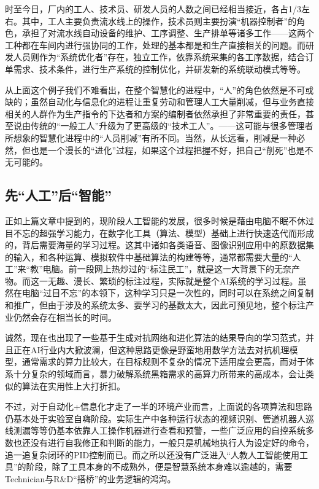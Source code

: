 \documentclass[]{book}
\begin{document}
时至今日，厂内的工人、技术员、研发人员的人数之间已经相当接近，各占1/3左右。其中，工人主要负责流水线上的操作，技术员则主要扮演``机器控制者''的角色，承担了对流水线自动设备的维护、工序调整、生产排单等诸多工作------这两个工种都在车间内进行强协同的工作，处理的基本都是和生产直接相关的问题。而研发人员则作为``系统优化者''存在，独立工作，依靠系统采集的各工序数据，结合订单需求、技术条件，进行生产系统的控制优化，并研发新的系统联动模式等等。

从上面这个例子我们不难看出，在整个智慧化的进程中，``人''的角色依然是不可或缺的；虽然自动化与信息化的进程让重复劳动和管理人工大量削减，但与业务直接相关的人群作为生产指令的下达者和方案的编制者依然承担了非常重要的责任，甚至说由传统的``一般工人''升级为了更高级的``技术工人''。------这可能与很多管理者所想象的智慧化进程中的``人员削减''有所不同。当然，从长远看，削减是一种必然，但也是一个漫长的``进化''过程，如果这个过程把握不好，把自己``削死''也是不无可能的。

\hypertarget{ux5148ux4ebaux5de5ux540eux667aux80fd}{%
\subsection{先``人工''后``智能''}\label{ux5148ux4ebaux5de5ux540eux667aux80fd}}

正如上篇文章中提到的，现阶段人工智能的发展，很多时候是藉由电脑不眠不休过目不忘的超强学习能力，在数字化工具（算法、模型）基础上进行快速迭代而形成的，背后需要海量的学习过程。这其中诸如各类语音、图像识别应用中的原数据集的输入，和各种运算、模拟软件中基础算法的构建等等，通常都需要大量的``人工''来``教''电脑。前一段网上热炒过的``标注民工''，就是这一大背景下的无奈产物。而这一无趣、漫长、繁琐的标注过程，实际就是整个AI系统的学习过程。虽然在电脑``过目不忘''的本领下，这种学习只是一次性的，同时可以在系统之间复制和推广，但由于涉及的系统太多、要学习的基数太大，因此可预见地，整个标注产业仍然会存在相当长的时间。

诚然，现在也出现了一些基于生成对抗网络和进化算法的结果导向的学习范式，并且正在AI行业内大掀波澜，但这种思路更像是野蛮地用数学方法去对抗机理模型，通常需求的算力比较大，在目标规则不复杂的情况下适用度会更高，而对于体系十分复杂的领域而言，暴力破解系统黑箱需求的高算力所带来的高成本，会让类似的算法在实用性上大打折扣。

不过，对于自动化+信息化才走了一半的环境产业而言，上面说的各项算法和思路仍基本处于实验室自嗨阶段。实际生产中各种运行状态的视频识别、管道机器人巡线测漏等等仍基本依靠人工操作机器进行查看和预警，一些广泛应用的自控系统多数也还没有进行自我修正和判断的能力，一般只是机械地执行人为设定好的命令，追一追复杂闭环的PID控制而已。而之所以还没有广泛进入``人教人工智能使用工具''的阶段，除了工具本身的不成熟外，便是智慧系统本身难以逾越的，需要Technician与R\&D``搭桥''的业务逻辑的鸿沟。
\end{document}
